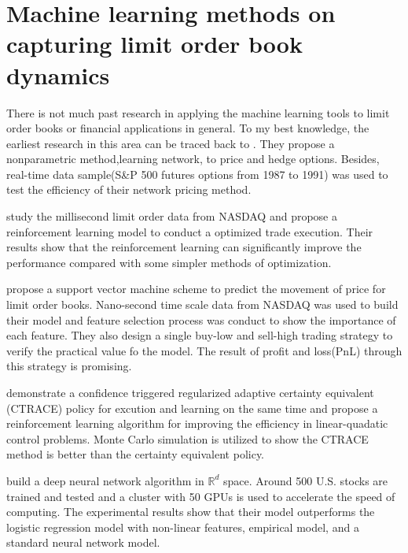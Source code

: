\section{Machine learning methods on capturing limit order book dynamics}
There is not much past research in applying the machine learning tools to limit order books or financial applications in general. To my best knowledge, the earliest research in this area can be traced back to \cite{hutchinson1994nonparametric}. They propose a nonparametric method,learning network, to price and hedge options. Besides, real-time data sample(S\&P 500 futures options from 1987 to 1991) was used to test the efficiency of their network pricing method. 

\cite{nevmyvaka2006reinforcement} study the millisecond limit order data from NASDAQ and propose a reinforcement learning model to conduct a optimized trade execution. Their results show that the reinforcement learning can significantly improve the performance compared with some simpler methods of optimization.

\cite{kercheval2015modelling} propose a support vector machine scheme to predict the movement of price for limit order books. Nano-second time scale data from NASDAQ was used to build their model and feature selection process was conduct to show the importance of each feature. They also design a single buy-low and sell-high trading strategy to verify the practical value fo the model. The result of profit and loss(PnL) through this strategy is promising.

\cite{park2015adaptive} demonstrate a confidence triggered regularized adaptive certainty equivalent (CTRACE) policy for excution and learning on the same time and propose a reinforcement learning algorithm for improving the efficiency in linear-quadatic control problems. Monte Carlo simulation is utilized to show the CTRACE method is better than the certainty equivalent policy. 

\cite{sirignano2016deep} build a deep neural network algorithm in $\mathbb{R}^d$ space. Around 500 U.S. stocks are trained and tested and a cluster with 50 GPUs is used to accelerate the speed of computing. The experimental results show that their model outperforms the logistic regression model  with non-linear features, empirical model,  and a standard neural network model.

